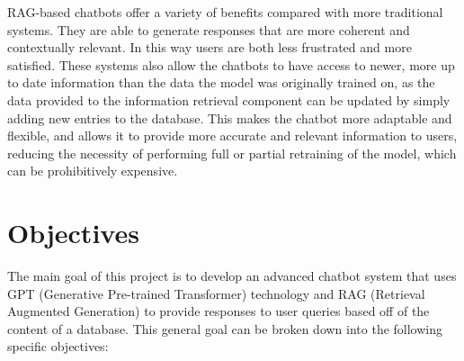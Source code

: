 \documentclass[a4paper,12pt,twoside]{ThesisStyle}
\begin{document}
RAG-based chatbots offer a variety of benefits compared with more traditional systems. They are able to generate responses that are more coherent and contextually relevant. In this way users are both less frustrated and more satisfied. These systems also allow the chatbots to have access to newer, more up to date information than the data the model was originally trained on, as the data provided to the information retrieval component can be updated by simply adding new entries to the database. This makes the chatbot more adaptable and flexible, and allows it to provide more accurate and relevant information to users, reducing the necessity of performing full or partial retraining of the model, which can be prohibitively expensive.

\chapter{Objectives}
\label{cap:objectives}

The main goal of this project is to develop an advanced chatbot system that uses GPT (Generative Pre-trained Transformer) technology and RAG (Retrieval Augmented Generation) to provide responses to user queries based off of the content of a database. This general goal can be broken down into the following specific objectives:
\end{document}
